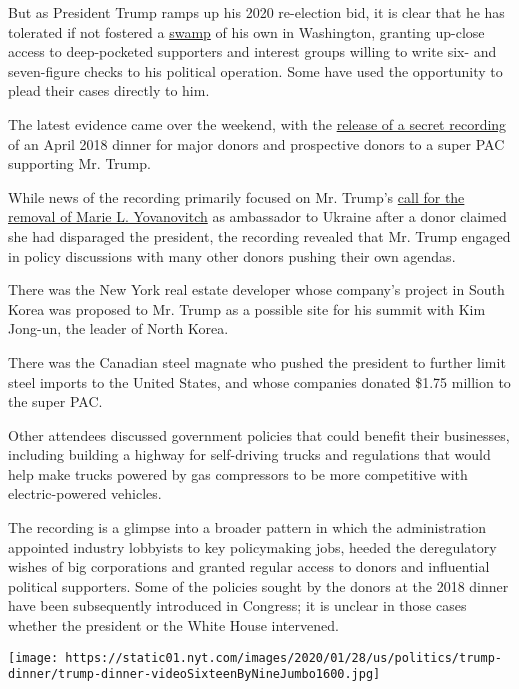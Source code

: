 But as President Trump ramps up his 2020 re-election bid, it is clear
that he has tolerated if not fostered a
\href{https://www.nytimes.com/2020/07/06/us/politics/trump-lobbyists-swamp-campaign.html}{swamp}
of his own in Washington, granting up-close access to deep-pocketed
supporters and interest groups willing to write six- and seven-figure
checks to his political operation. Some have used the opportunity to
plead their cases directly to him.

The latest evidence came over the weekend, with the
\href{https://www.nytimes.com/2020/01/25/us/politics/trump-ukraine-donors.html}{release
of a secret recording} of an April 2018 dinner for major donors and
prospective donors to a super PAC supporting Mr. Trump.

While news of the recording primarily focused on Mr. Trump's
\href{https://www.nytimes.com/2020/01/24/us/politics/trump-recording-yovanovitch.html}{call
for the removal of Marie L. Yovanovitch} as ambassador to Ukraine after
a donor claimed she had disparaged the president, the recording revealed
that Mr. Trump engaged in policy discussions with many other donors
pushing their own agendas.

There was the New York real estate developer whose company's project in
South Korea was proposed to Mr. Trump as a possible site for his summit
with Kim Jong-un, the leader of North Korea.

There was the Canadian steel magnate who pushed the president to further
limit steel imports to the United States, and whose companies donated
\$1.75 million to the super PAC.

Other attendees discussed government policies that could benefit their
businesses, including building a highway for self-driving trucks and
regulations that would help make trucks powered by gas compressors to be
more competitive with electric-powered vehicles.

The recording is a glimpse into a broader pattern in which the
administration appointed industry lobbyists to key policymaking jobs,
heeded the deregulatory wishes of big corporations and granted regular
access to donors and influential political supporters. Some of the
policies sought by the donors at the 2018 dinner have been subsequently
introduced in Congress; it is unclear in those cases whether the
president or the White House intervened.

\texttt{[image: https://static01.nyt.com/images/2020/01/28/us/politics/trump-dinner/trump-dinner-videoSixteenByNineJumbo1600.jpg]}

